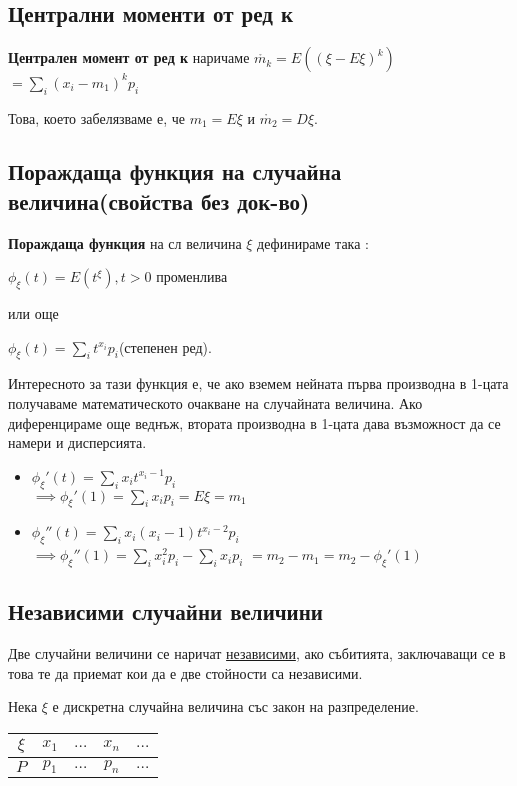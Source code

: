 \documentclass[fleqn,12pt]{article}
\begin{document}
\begin{justify}
\subsection{Централни моменти от ред к}
\textbf{Централен момент от ред к} наричаме $\mathring{m_k} = E((\xi - E\xi)^k) $
$= \sum_i (x_i-m_1)^kp_i$

Това, което забелязваме е, че $m_1 = E\xi$ и $\mathring{m_2} = D\xi$.

\subsection{Пораждаща функция на случайна величина(свойства без док-во)}
\textbf{Пораждаща функция} на сл величина $\xi$ дефинираме така :

$\phi_\xi(t) = E(t^\xi), t > 0$ променлива

или още 

$\phi_\xi(t) = \sum_i t^{x_i}p_i$(степенен ред).

Интересното за тази функция е, че ако вземем нейната първа производна в 1-цата получаваме математическото очакване на 
случайната величина. Ако диференцираме още веднъж, втората производна в 1-цата дава възможност да се намери и 
дисперсията.
\begin{itemize}
    \item $\phi_\xi'(t) = \sum_{i} x_it^{x_{i}-1}p_i$\\
    $\implies  \phi_\xi'(1) = \sum_{i} x_ip_i = E\xi = m_1$
    \item $\phi_\xi''(t) = \sum_{i} x_i(x_{i}-1)t^{x_{i}-2}p_i$\\
    $\implies \phi_\xi''(1)=\sum_{i} x_i^2p_i - \sum_{i} x_ip_i$
    $= m_2 - m_1  = m_2 - \phi_\xi'(1)$
\end{itemize}

\subsection{Независими случайни величини}
Две случайни величини се наричат \underline{независими}, ако събитията, заключаващи се в това те да приемат кои да е 
две стойности са независими.

Нека $\xi$ е дискретна случайна величина със закон на разпределение.\\
\begin{tabular}{|c|c|c|c|c|}
    \hline
    $\xi$ & $x_1$ & $\dots$ & $x_n$ & $\dots$ \\
    \hline
    $P$ & $p_1$ & $\dots$ & $p_n$ & $\dots$ \\
    \hline
\end{tabular}


\end{justify}
\end{document}
